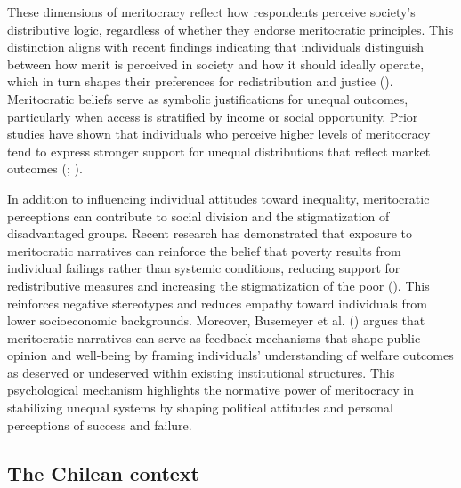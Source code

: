 \documentclass[
  12pt,
]{article}
\begin{document}
These dimensions of meritocracy reflect how respondents perceive
society's distributive logic, regardless of whether they endorse
meritocratic principles. This distinction aligns with recent findings
indicating that individuals distinguish between how merit is perceived
in society and how it should ideally operate, which in turn shapes their
preferences for redistribution and justice
(). Meritocratic beliefs serve as symbolic justifications for
unequal outcomes, particularly when access is stratified by income or
social opportunity. Prior studies have shown that individuals who
perceive higher levels of meritocracy tend to express stronger support
for unequal distributions that reflect market outcomes
(;
).

In addition to influencing individual attitudes toward inequality,
meritocratic perceptions can contribute to social division and the
stigmatization of disadvantaged groups. Recent research has demonstrated
that exposure to meritocratic narratives can reinforce the belief that
poverty results from individual failings rather than systemic
conditions, reducing support for redistributive measures and increasing
the stigmatization of the poor (). This reinforces negative stereotypes and reduces empathy
toward individuals from lower socioeconomic backgrounds. Moreover,
Busemeyer et al. () argues
that meritocratic narratives can serve as feedback mechanisms that shape
public opinion and well-being by framing individuals' understanding of
welfare outcomes as deserved or undeserved within existing institutional
structures. This psychological mechanism highlights the normative power
of meritocracy in stabilizing unequal systems by shaping political
attitudes and personal perceptions of success and failure.

\subsection{The Chilean context}\label{the-chilean-context}
\end{document}
